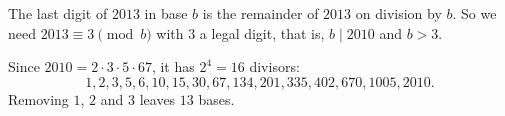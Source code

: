 The last digit of $2013$ in base $b$ is the remainder of $2013$ on division by $b$. So we need $2013\equiv 3\pmod b$ with $3$ a legal digit, that is, $b\mid 2010$ and $b>3$.

Since $2010=2\cdot3\cdot5\cdot67$, it has $2^4=16$ divisors:
\[1,2,3,5,6,10,15,30,67,134,201,335,402,670,1005,2010.\]
Removing $1$, $2$ and $3$ leaves $\boxed{13}$ bases.
